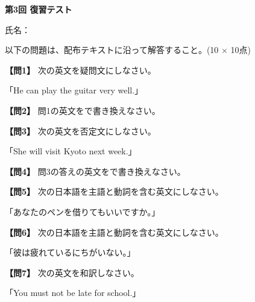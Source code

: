 
\begin{center}
{\Large\textbf{第3回 復習テスト}}
\end{center}

\vspace{0.2em}
\begin{flushright}
氏名：\underline{\hspace{14em}}
\end{flushright}

\vspace{0.3em}
\noindent 以下の問題は、配布テキストに沿って解答すること。(10 $\times$ 10点)

\vspace{0.5em}

\noindent\textbf{【問1】} 次の英文を疑問文にしなさい。

「He can play the guitar very well.」

\testqsep

\noindent\textbf{【問2】} 問1の英文をで書き換えなさい。

\testqsep

\noindent\textbf{【問3】} 次の英文を否定文にしなさい。

「She will visit Kyoto next week.」

\testqsep

\noindent\textbf{【問4】} 問3の答えの英文をで書き換えなさい。

\testqsep

\noindent\textbf{【問5】} 次の日本語を主語と動詞を含む英文にしなさい。

「あなたのペンを借りてもいいですか。」

\testqsep

\noindent\textbf{【問6】} 次の日本語を主語と動詞を含む英文にしなさい。

「彼は疲れているにちがいない。」

\testqsep

\noindent\textbf{【問7】} 次の英文を和訳しなさい。

「You must not be late for school.」

\testqsep

